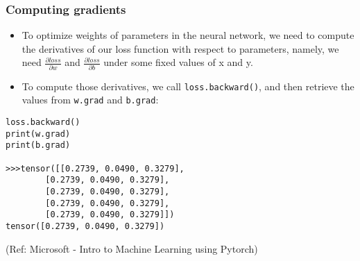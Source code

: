 \begin{frame}[fragile] \frametitle{Computing gradients}

\begin{itemize}
\item To optimize weights of parameters in the neural network, we need to compute the derivatives of our loss function with respect to parameters, namely, we need  $\frac{\partial loss}{\partial w}$ and
$\frac{\partial loss}{\partial b}$   under some fixed values of x and y. 
\item To compute those derivatives, we call \lstinline|loss.backward()|, and then retrieve the values from \lstinline|w.grad| and \lstinline|b.grad|:
\end{itemize}

\begin{lstlisting}
loss.backward()
print(w.grad)
print(b.grad)

>>>tensor([[0.2739, 0.0490, 0.3279],
        [0.2739, 0.0490, 0.3279],
        [0.2739, 0.0490, 0.3279],
        [0.2739, 0.0490, 0.3279],
        [0.2739, 0.0490, 0.3279]])
tensor([0.2739, 0.0490, 0.3279])
\end{lstlisting}

\tiny{(Ref: Microsoft - Intro to Machine Learning using Pytorch)}
\end{frame}


